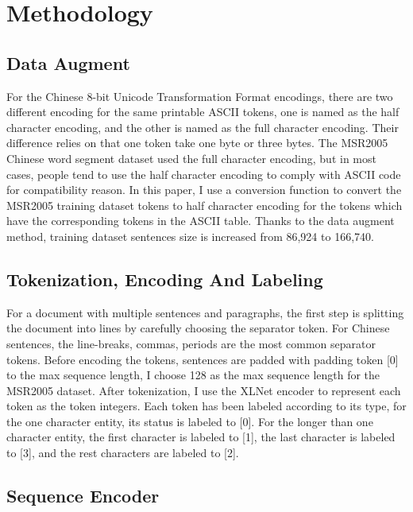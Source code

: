 \documentclass[11pt,a4paper]{article}
\begin{document}
\section{Methodology}
\label{sec:hireachy}

\subsection{Data Augment}

For the Chinese 8-bit Unicode Transformation Format encodings, there are two different encoding for the same printable ASCII tokens, one is named as the half character encoding,
and the other is named as the full character encoding.
Their difference relies on that one token take one byte or three bytes. The MSR2005 Chinese word segment dataset used the full character encoding, but in most cases,
people tend to use the half character encoding to comply with ASCII code for compatibility reason.
In this paper, I use a conversion function to convert the MSR2005 training dataset tokens to half character encoding for the tokens which have the corresponding tokens in the ASCII table.
Thanks to the data augment method, training dataset sentences size is increased from 86,924 to 166,740.

\subsection{Tokenization, Encoding And Labeling}

For a document with multiple sentences and paragraphs, the first step is splitting the document into lines by carefully choosing the separator token.
For Chinese sentences, the line-breaks, commas, periods are the most common separator tokens.
Before encoding the tokens, sentences are padded with padding token [0] to the max sequence length, I choose 128 as the max sequence length for the MSR2005 dataset.
After tokenization, I use the XLNet encoder to represent each token as the token integers.
Each token has been labeled according to its type, for the one character entity, its status is labeled to [0].
For the longer than one character entity, the first character is labeled to [1], the last character is labeled to [3], and the rest characters are labeled to [2].

\subsection{Sequence Encoder}
\end{document}
